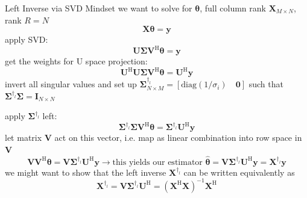 \documentclass[mathserif, aspectratio=1610]{intbeamer}
\begin{document}
\begin{frame}{Left Inverse via SVD Mindset}
we want to solve for ${\bm{\theta}}$, full column rank $\bm{X}_{M \times N}$, rank $R=N$
$$\bm{X} {\bm{\theta}} = \bm{y}$$
apply SVD:
$$\bm{U} \bm{\Sigma} \bm{V}^\mathrm{H} {\bm{\theta}} = \bm{y}$$
get the weights for U space projection:
$$\bm{U}^\mathrm{H} \bm{U} \bm{\Sigma} \bm{V}^\mathrm{H} {\bm{\theta}} = \bm{U}^\mathrm{H}\bm{y}$$
invert all singular values and set up $\bm{\Sigma}^{\dagger_l}_{N \times M} = [\mathrm{diag}(1/\sigma_i) \quad \bm{0}]$ such that
$\bm{\Sigma}^{\dagger_l}\bm{\Sigma} = \bm{I}_{N \times N}$

apply $\bm{\Sigma}^{\dagger_l}$ left:
$$\bm{\Sigma}^{\dagger_l}\bm{\Sigma} \bm{V}^\mathrm{H} {\bm{\theta}} = \bm{\Sigma}^{\dagger_l}\bm{U}^\mathrm{H}\bm{y}$$
let matrix $\bm{V}$ act on this vector, i.e. map as linear combination into row space in $\bm{V}$
$$\bm{V} \bm{V}^\mathrm{H} {\bm{\theta}} = \bm{V} \bm{\Sigma}^{\dagger_l}\bm{U}^\mathrm{H}\bm{y}
\rightarrow \text{this yields our estimator } \hat{\bm{\theta}} = \bm{V} \bm{\Sigma}^{\dagger_l}\bm{U}^\mathrm{H}\bm{y} = \bm{X}^{\dagger_l} \bm{y}$$
we might want to show that the left inverse $\bm{X}^{\dagger_l}$ can be written equivalently as
$$\bm{X}^{\dagger_l} = \bm{V} \bm{\Sigma}^{\dagger_l}\bm{U}^\mathrm{H} = (\bm{X}^\mathrm{H}\bm{X})^{-1} \bm{X}^\mathrm{H}$$
\end{frame}
\end{document}
